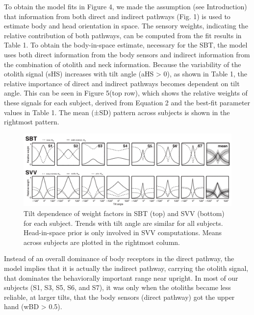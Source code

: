 To obtain the model fits in Figure 4, we made the assumption (see Introduction) that information from both direct and indirect pathways (Fig. 1) is used to estimate body and head orientation in space. The sensory weights, indicating the relative contribution of both pathways, can be computed from the fit results in Table 1. To obtain the body-in-space estimate, necessary for the SBT, the model uses both direct information from the body sensors and indirect information from the combination of otolith and neck information. Because the variability of the otolith signal (sHS) increases with tilt angle (aHS > 0), as shown in Table 1, the relative importance of direct and indirect pathways becomes dependent on tilt angle. This can be seen in Figure 5(top row), which shows the relative weights of these signals for each subject, derived from Equation 2 and the best-fit parameter values in Table 1. The mean (±SD) pattern across subjects is shown in the rightmost pattern. 

\begin{figure}
    \includegraphics[width=1.0\textwidth]{src/paper1/figure5.pdf}
    
    \caption{Tilt dependence of weight factors in SBT (top) and SVV (bottom) for each subject. Trends with tilt angle are similar for all subjects. Head-in-space prior is only involved in SVV computations. Means across subjects are plotted in the rightmost column.}
\end{figure}

Instead of an overall dominance of body receptors in the direct pathway, the model implies that it is actually the indirect pathway, carrying the otolith signal, that dominates the behaviorally important range near upright. In most of our subjects (S1, S3, S5, S6, and S7), it was only when the otoliths became less reliable, at larger tilts, that the body sensors (direct pathway) got the upper hand (wBD > 0.5). 


